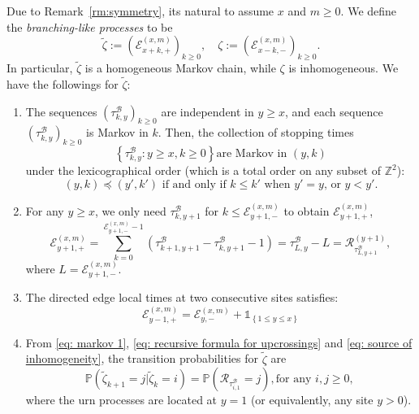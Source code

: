 \documentclass[EJP]{ejpecp} %
\begin{document}
Due to Remark~\ref{rm:symmetry}, its natural to assume $x$ and $m \ge 0$. We define the \textit{branching-like processes} to be
\[
\tilde{\zeta} := \left(\mathcal{E}^{(x,m)}_{x+k,+} \right)_{k\geq 0}, \quad
\zeta := \left(\mathcal{E}^{(x,m)}_{x-k,-} \right)_{k\geq 0}
.\]
In particular, $\tilde{\zeta}$ is a homogeneous Markov chain, while $\zeta$ is inhomogeneous. We have the followings for 	$\tilde{\zeta}$:
\begin{enumerate}
	\item The sequences $(\tau^{\mathscr{B}}_{k,y})_{k\geq 0} $ are independent in $y \geq x$, and each sequence $\left(\tau^{\mathscr{B}}_{k,y}\right)_{k\geq 0} $ is Markov in $k$. Then, the collection of stopping times
	\begin{equation}\label{eq: markov 1} 
		\left\{\tau^{\mathscr{B}}_{k,y}: y\geq x, k\geq 0 \right\} \mbox{are Markov in $(y,k)$}
	\end{equation}
	under the lexicographical order (which is a total order on any subset of $\mathbb{Z}^2$): 
	\begin{equation*}\label{eq: lexicographical order}
		(y,k) \preceq (y',k')  \mbox{ if and only if }
		k \leq k'   \mbox{ when $y' = y$, or } 
		y <y'. 
	\end{equation*} 
	
	\item For any $y\geq x$, we only need $\tau^{\mathscr{B}}_{k,y+1}$ for $k\leq \mathcal{E}^{(x,m)}_{y+1,-}$ to obtain $\mathcal{E}^{(x,m)}_{y+1,+}$,
	\begin{equation} \label{eq: recursive formula for upcrossings}
		\mathcal{E}_{y+1,+}^{(x,m)}	=  \sum_{k= 0 }^{\mathcal{E}_{y+1,-}^{(x,m)}-1}	\left(\tau^{\mathscr{B}}_{k+1,y+1}-\tau^{\mathscr{B}}_{k,y+1}-1 \right) = \tau^{\mathscr{B}}_{ L,y } - L = \mathscr{R}^{(y + 1)}_{\tau^{\mathscr{B}}_{ L,y+1 }},
	\end{equation}
	where $L = \mathcal{E}_{y+1,-}^{(x,m)}$.
	
	\item The directed edge local times at two consecutive sites satisfies:
	\begin{equation}\label{eq: source of inhomogeneity}
		\mathcal{E}_{y-1,+}^{(x,m)} = \mathcal{E}_{y,-}^{(x,m)} + \mathbb{1}_{ \left\{ 1\leq y \leq x \right\} }
	\end{equation}
	
	\item  From \eqref{eq: markov 1}, \eqref{eq: recursive formula for upcrossings} and \eqref{eq: source of inhomogeneity}, the transition probabilities for $\tilde{\zeta}$ are 
	\begin{equation}\label{eq: transition prob on positive}
		\mathbb{P}\left(\tilde{\zeta}_{k+1}=j \vert \tilde{\zeta}_k =i  \right) = 
		\mathbb{P}\left( \mathscr{R}_{\tau_{i,1}^{\mathscr{B}}} = j \right), \mbox{for any $i,j\geq 0$, } 
	\end{equation} 
	where the urn processes are located at $y = 1$ (or equivalently, any site $y>0$).
\end{enumerate}
\end{document}
